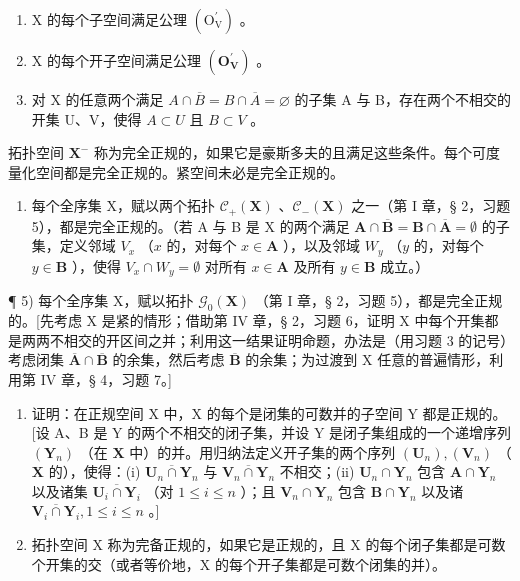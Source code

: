 \begin{enumerate}
\def\labelenumi{\alph{enumi})}
\item
  X 的每个子空间满足公理 \((\mathrm{O}_{\mathrm{V}}^{\prime})\) 。
\item
  X 的每个开子空间满足公理 \((\mathbf{O}_{\mathbf{V}}^{\prime})\) 。
\item
  对 X 的任意两个满足 \(A \cap \overline{B} = B \cap \overline{A} = \varnothing\) 的子集 A 与 B，存在两个不相交的开集 U、V，使得 \(A \subset U\) 且 \(B \subset V\) 。
\end{enumerate}

拓扑空间 \(\mathbf{X}^{-}\) 称为完全正规的，如果它是豪斯多夫的且满足这些条件。每个可度量化空间都是完全正规的。紧空间未必是完全正规的。

\begin{enumerate}
\def\labelenumi{\arabic{enumi})}
\setcounter{enumi}{3}
\tightlist
\item
  每个全序集 X，赋以两个拓扑 \(\mathcal{C}_{+}(\mathbf{X})\) 、\(\mathcal{C}_{-}(\mathbf{X})\) 之一（第 I 章，§ 2，习题 5），都是完全正规的。（若 A 与 B 是 X 的两个满足 \(\mathbf{A} \cap \overline{\mathbf{B}} = \mathbf{B} \cap \overline{\mathbf{A}} = \emptyset\) 的子集，定义邻域 \(V_{x}\) （\(x\) 的，对每个 \(x \in \mathbf{A}\) ），以及邻域 \(W_{y}\) （\(y\) 的，对每个 \(y \in \mathbf{B}\) ），使得 \(V_{x} \cap W_{y} = \emptyset\) 对所有 \(x \in \mathbf{A}\) 及所有 \(y \in \mathbf{B}\) 成立。）
\end{enumerate}

¶ 5) 每个全序集 X，赋以拓扑 \(\mathcal{G}_{0}(\mathbf{X})\) （第 I 章，§ 2，习题 5），都是完全正规的。{[}先考虑 X 是紧的情形；借助第 IV 章，§ 2，习题 6，证明 X 中每个开集都是两两不相交的开区间之并；利用这一结果证明命题，办法是（用习题 3 的记号）考虑闭集 \(\overline{\mathbf{A}}\cap\overline{\mathbf{B}}\) 的余集，然后考虑 \(\overline{\mathbf{B}}\) 的余集；为过渡到 X 任意的普遍情形，利用第 IV 章，§ 4，习题 7。{]}

\begin{enumerate}
\def\labelenumi{\arabic{enumi})}
\setcounter{enumi}{5}
\item
  证明：在正规空间 X 中，X 的每个是闭集的可数并的子空间 Y 都是正规的。{[}设 A、B 是 Y 的两个不相交的闭子集，并设 Y 是闭子集组成的一个递增序列 \((\mathbf{Y}_n)\) （在 \(\mathbf{X}\) 中）的并。用归纳法定义开子集的两个序列 \((\mathbf{U}_n), (\mathbf{V}_n)\) （\(\mathbf{X}\) 的），使得：(i) \(\overline{\mathbf{U}_n \cap \mathbf{Y}_n}\) 与 \(\overline{\mathbf{V}_n \cap \mathbf{Y}_n}\) 不相交；(ii) \(\mathbf{U}_n \cap \mathbf{Y}_n\) 包含 \(\mathbf{A} \cap \mathbf{Y}_n\) 以及诸集 \(\overline{\mathbf{U}_i \cap \mathbf{Y}_i}\) （对 \(1 \leqslant i \leqslant n\) ）；且 \(\mathbf{V}_n \cap \mathbf{Y}_n\) 包含 \(\mathbf{B} \cap \mathbf{Y}_n\) 以及诸 \(\overline{\mathbf{V}_i \cap \mathbf{Y}_i}, 1 \leqslant i \leqslant n\) 。{]}
\item
  拓扑空间 X 称为完备正规的，如果它是正规的，且 X 的每个闭子集都是可数个开集的交（或者等价地，X 的每个开子集都是可数个闭集的并）。
\end{enumerate}

